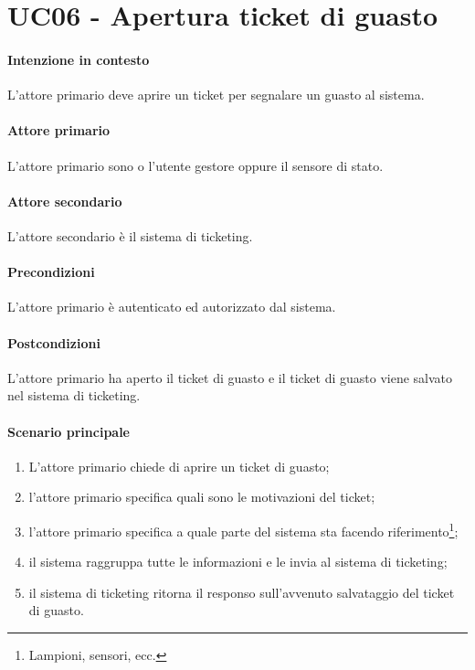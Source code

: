 \section{UC06 - Apertura ticket di guasto}\label{uc:06}

\paragraph{Intenzione in contesto} L'attore primario deve aprire un ticket per segnalare un guasto al sistema.

\paragraph{Attore primario} L'attore primario sono o l'utente gestore oppure il sensore di stato.

\paragraph{Attore secondario} L'attore secondario è il sistema di ticketing.

\paragraph{Precondizioni} L'attore primario è autenticato ed autorizzato dal sistema.

\paragraph{Postcondizioni} L'attore primario ha aperto il ticket di guasto e il ticket di guasto viene salvato nel sistema di ticketing.

\paragraph{Scenario principale}

\begin{enumerate}
    \item L'attore primario chiede di aprire un ticket di guasto;
    \item l'attore primario specifica quali sono le motivazioni del ticket;
    \item l'attore primario specifica a quale parte del sistema sta facendo riferimento\footnote{Lampioni, sensori, ecc.};
    \item il sistema raggruppa tutte le informazioni e le invia al sistema di ticketing;
    \item il sistema di ticketing ritorna il responso sull'avvenuto salvataggio del ticket di guasto.
\end{enumerate}
